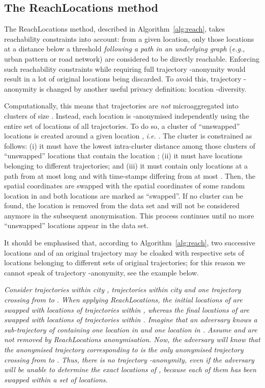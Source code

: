 \subsection{The ReachLocations method}

The ReachLocations method, described in Algorithm~\ref{alg:reach},
takes reachability constraints into account: from a given
location, only those locations at a distance below a threshold
{\em following a path in an underlying graph} ({\em e.g.},
urban pattern or road network) are considered to be directly
reachable. Enforcing such reachability constraints while requiring
full trajectory -anonymity would result in a lot of original locations
being discarded. To avoid this, trajectory -anonymity is
changed by another useful privacy definition: location -diversity.

Computationally, this means that trajectories are {\em not} microaggregated
into clusters of size . Instead,
each location is -anonymised independently using
the entire set of locations of all trajectories. To do so, a
cluster  of ``unswapped'' locations is created around a
given location , {\em i.e.}
.
The cluster  is constrained as follows:
(i) it must have the lowest intra-cluster distance among those clusters
of  ``unswapped'' locations that contain the location ;
(ii) it must have locations belonging to  different trajectories; and (iii)
it must contain only locations at a path from 
at most  long and with time-stamps differing from
 at most . Then, the spatial coordinates
 are swapped with the
spatial coordinates of some random location in 
and both locations are marked as ``swapped''. If no cluster 
can be found, the location  is removed from the data set
and will not be considered anymore in the subsequent anonymisation.
This process continues until no more ``unswapped'' locations
appear in the data set.

It should be emphasised that, according to Algorithm~\ref{alg:reach},
two successive locations 
and  of
an original trajectory
 may be cloaked with respective sets of  locations belonging
to different sets of  original trajectories; for this reason
we cannot speak of trajectory -anonymity, see the example below.

\begin{example}{\em
Consider  trajectories
within city ,  trajectories within city 
and one trajectory  crossing from  to .
When applying ReachLocations, the initial locations of
 are swapped with locations of trajectories
within , whereas the final locations of 
are swapped with locations of trajectories within .
Imagine that an adversary knows a sub-trajectory 
of  containing
one location  in  and one
location  in .
Assume  and  are not removed by
ReachLocations anonymisation.
Now, the adversary will know that the anonymised trajectory
 corresponding to  is the only anonymised
trajectory crossing from  to . Thus, there is no
trajectory -anonymity, even if the adversary will
be unable to determine the exact locations of ,
because each of them has been swapped within a set of  locations.}
\end{example}

